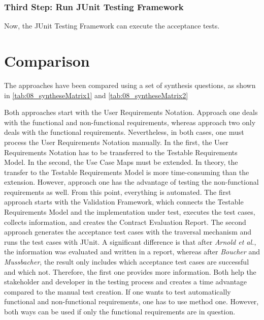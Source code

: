 

\subsubsection{Third Step: Run JUnit Testing Framework}
Now, the JUnit Testing Framework can execute the acceptance tests.
\section{Comparison}
\label{topic08:sectionComparison}

The approaches have been compared using a set of synthesis questions, as shown in \autoref{tab:08_syntheseMatrix1} and \autoref{tab:08_syntheseMatrix2}

Both approaches start with the User Requirements Notation. Approach one deals with the functional and non-functional requirements, whereas approach two only deals with the functional requirements. Nevertheless, in both cases, one must process the User Requirements Notation manually. In the first, the User Requirements Notation has to be transferred to the Testable Requirements Model. In the second, the Use Case Maps must be extended. In theory, the transfer to the Testable Requirements Model is more time-consuming than the extension. However, approach one has the advantage of testing the non-functional requirements as well. From this point, everything is automated. The first approach starts with the Validation Framework, which connects the Testable Requirements Model and the implementation under test, executes the test cases, collects information, and creates the Contract Evaluation Report. The second approach generates the acceptance test cases with the traversal mechanism and runs the test cases with JUnit. A significant difference is that after \textit{Arnold et al.}, the information was evaluated and written in a report, whereas after \textit{Boucher} and \textit{Mussbacher}, the result only includes which acceptance test cases are successful and which not. Therefore, the first one provides more information. Both help the stakeholder and developer in the testing process and creates a time advantage compared to the manual test creation. If one wants to test automatically functional and non-functional requirements, one has to use method one. However, both ways can be used if only the functional requirements are in question.

